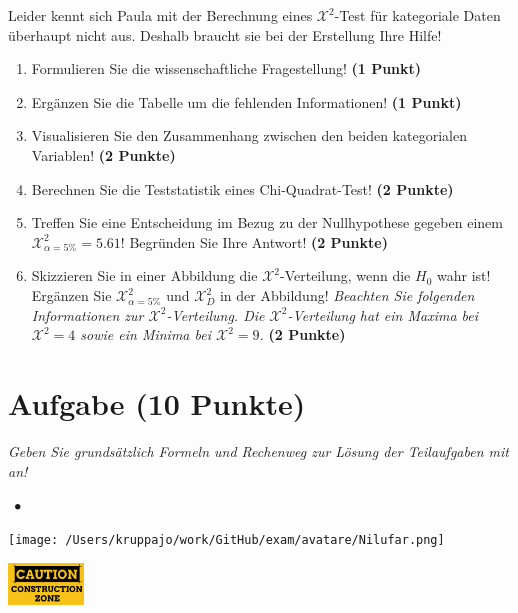 \documentclass[a4paper, 9pt]{scrartcl}\usepackage[]{graphicx}\usepackage[]{xcolor}
\begin{document}
\vspace{5Ex}

Leider kennt sich Paula mit der Berechnung eines $\mathcal{X}^2$-Test für kategoriale Daten überhaupt nicht aus. Deshalb braucht sie bei der Erstellung Ihre Hilfe!

\begin{enumerate}
\item Formulieren Sie die wissenschaftliche Fragestellung! \textbf{(1 Punkt)}
\item Ergänzen Sie die Tabelle um die fehlenden Informationen! \textbf{(1 Punkt)} 
\item Visualisieren Sie den Zusammenhang zwischen den beiden kategorialen Variablen! \textbf{(2 Punkte)}
\item Berechnen Sie die Teststatistik eines Chi-Quadrat-Test! \textbf{(2 Punkte)}
\item Treffen Sie eine Entscheidung im Bezug zu der Nullhypothese gegeben
  einem $\mathcal{X}^2_{\alpha = 5\%} = 5.61$! Begründen Sie Ihre Antwort!
  \textbf{(2 Punkte)}
\item Skizzieren Sie in einer Abbildung die $\mathcal{X}^2$-Verteilung, wenn die $H_0$ wahr ist! Ergänzen Sie  $\mathcal{X}^2_{\alpha = 5\%}$ und $\mathcal{X}^2_{D}$ in der Abbildung! \textit{Beachten Sie folgenden Informationen zur $\mathcal{X}^2$-Verteilung. Die $\mathcal{X}^2$-Verteilung hat ein Maxima bei $\mathcal{X}^2 = 4$ sowie ein Minima bei $\mathcal{X}^2 = 9$.} \textbf{(2 Punkte)}
\end{enumerate} 
\clearpage

\section{Aufgabe \hfill (10 Punkte)}

\textit{Geben Sie grundsätzlich Formeln und Rechenweg zur Lösung der Teilaufgaben mit an!} \\[1Ex]
 

 
\ifcollection
\begin{flushright}
\tiny\vspace{-3Ex}
\textbf{\examinhaltstart}
\exammodulestat $\;\bullet$
\exammodulestatbbv 
\vspace{-4Ex}
\end{flushright}
\begin{minipage}[t]{0.5\textwidth}
\texttt{[image: /Users/kruppajo/work/GitHub/exam/avatare/Nilufar.png]}
\end{minipage}
\begin{minipage}[t]{0.5\textwidth}
\hfill
\href{https://youtu.be/-Kva5wc5Elw}{\includegraphics[width = 2cm]{img/caution}}
\end{minipage}
\vspace{-3Ex}
\fi
\end{document}
